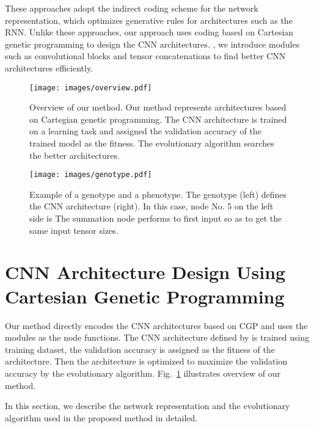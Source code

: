 These approaches adopt the indirect coding scheme for the network representation, which optimizes generative rules for  architectures such as the RNN.
Unlike these approaches, our approach uses  coding based on Cartesian genetic programming to design the CNN architectures.
, we introduce   modules\new{,} such as convolutional blocks and tensor concatenations\new{,} to find better CNN architectures efficiently.

\begin{figure}[t]
\texttt{[image: images/overview.pdf]}
\caption{Overview of our method. Our method represents  architectures based on Cartegian genetic programming. The CNN architecture is trained on a learning task and assigned the validation accuracy of the trained model as the fitness. The evolutionary algorithm searches the better architectures.}
\label{overview}
\end{figure}

\begin{figure*}[t]
\texttt{[image: images/genotype.pdf]}
\caption{Example of a genotype and a phenotype. The genotype (left) defines the CNN architecture (right). In this case, node No. 5 on the left side is  The summation node performs  to  first input so as to get the same input tensor sizes.}
\label{genotype}
\end{figure*}

\section{CNN Architecture Design Using Cartesian Genetic Programming}
Our method directly encodes the CNN architectures based on CGP \cite{harding_evolution_2008,miller_redundancy_2006,miller_cartesian_2000} and uses the  modules as the node functions.
The CNN architecture defined by  is trained using  training dataset,  the validation accuracy is assigned as the fitness of the architecture. Then\new{,} the architecture is optimized to maximize the validation accuracy by the evolutionary algorithm.
Fig.~\ref{overview} illustrates  overview of our method.

In this section, we describe the network representation and the evolutionary algorithm used in the proposed method in detailed.

